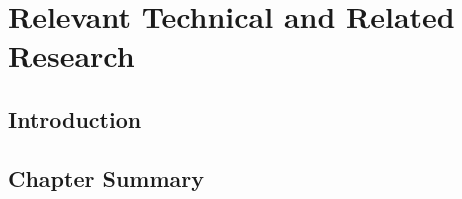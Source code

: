 \chapter{Relevant Technical and Related Research}
\label{c:02_related}

\section{Introduction}



\section{Chapter Summary}








